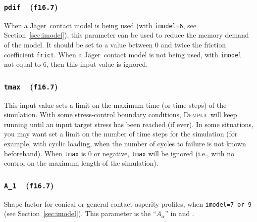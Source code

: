 \documentclass[letterpaper,11pt]{article}
\newcommand{\Dempla}{\textsc{Dempla}}
\newcommand{\Var}[2]{\texttt{#1}\ \  (\texttt{#2})}
\begin{document}
\subsubsection[\texttt{pdif}]{\Var{pdif}{f16.7}}\label{sec:pdif}
When a J\"{a}ger\ contact model is being used 
(with \texttt{imodel=6}, see Section~\ref{sec:imodel}),
this parameter can be used to reduce the memory demand of the model.
It should be set to a value between 0 and twice the friction
coefficient \texttt{frict}.
When a  J\"{a}ger\ contact model is not being used,
with \texttt{imodel} not equal to 6, then this input value is ignored.
%
\subsubsection[\texttt{tmax}]{\Var{tmax}{f16.7}}\label{sec:tmax}
This input value sets a limit on the maximum time (or time steps) of
the simulation.
With some stress-control boundary conditions,
\Dempla\ will keep running
until an input target stress has been reached (if ever).
In some situations, you may want set a limit on the number of
time steps for the simulation
(for example, with cyclic loading, when the number of cycles
to failure is not known beforehand).
When \texttt{tmax} is 0 or negative, \texttt{tmax} will be ignored
(i.e., with no control on the maximum length of the simulation).
%
%
\subsubsection[\texttt{A\_1}]{\Var{A\_1}{f16.7}}\label{sec:A1}
Shape factor for conical or general contact asperity profiles,
when \texttt{imodel=7 or 9}
(see Section~\ref{sec:imodel}).
This parameter is the ``$A_{\alpha}$'' in
\citep{Jager:1999a} and \citep{Kuhn:2014c}.
%
\end{document}
